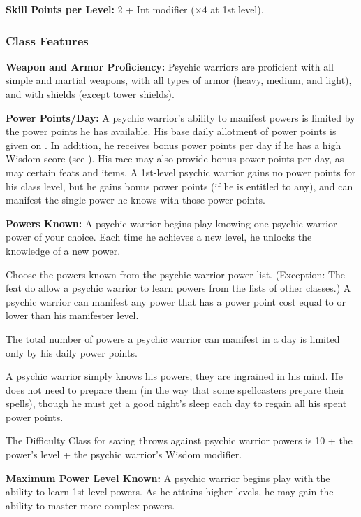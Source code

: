 \textbf{Skill Points per Level:} 2 + Int modifier ($\times 4$ at 1st level).

\subsubsection{Class Features}

\textbf{Weapon and Armor Proficiency:} Psychic warriors are proficient with all simple and martial weapons, with all types of armor (heavy, medium, and light), and with shields (except tower shields).

\textbf{Power Points/Day:} A psychic warrior's ability to manifest powers is limited by the power points he has available. His base daily allotment of power points is given on . In addition, he receives bonus power points per day if he has a high Wisdom score (see ). His race may also provide bonus power points per day, as may certain feats and items. A 1st-level psychic warrior gains no power points for his class level, but he gains bonus power points (if he is entitled to any), and can manifest the single power he knows with those power points.

\textbf{Powers Known:} A psychic warrior begins play knowing one psychic warrior power of your choice. Each time he achieves a new level, he unlocks the knowledge of a new power.

Choose the powers known from the psychic warrior power list. (Exception: The feat  do allow a psychic warrior to learn powers from the lists of other classes.) A psychic warrior can manifest any power that has a power point cost equal to or lower than his manifester level.

The total number of powers a psychic warrior can manifest in a day is limited only by his daily power points.

A psychic warrior simply knows his powers; they are ingrained in his mind. He does not need to prepare them (in the way that some spellcasters prepare their spells), though he must get a good night's sleep each day to regain all his spent power points.

The Difficulty Class for saving throws against psychic warrior powers is 10 + the power's level + the psychic warrior's Wisdom modifier.

\textbf{Maximum Power Level Known:} A psychic warrior begins play with the ability to learn 1st-level powers. As he attains higher levels, he may gain the ability to master more complex powers.

